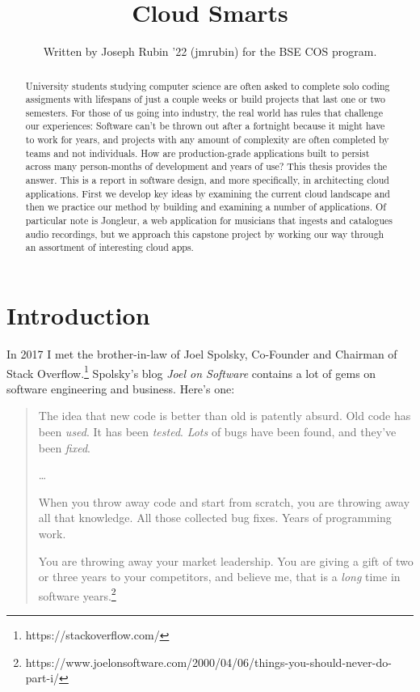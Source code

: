 \documentclass{article}
\begin{document}
\title{Cloud Smarts}

\author{Written by Joseph Rubin '22 (jmrubin) for the BSE COS program.}

\date{}
\maketitle

\thispagestyle{empty}


\begin{abstract}
  University students studying computer science are often asked to complete solo coding assigments with lifespans of just a couple weeks or build projects that last one or two semesters.
  For those of us going into industry, the real world has rules that challenge our experiences:
  Software can't be thrown out after a fortnight because it might have to work for years, and projects with any amount of complexity are often completed by teams and not individuals.
  How are production-grade applications built to persist across many person-months of development and years of use?
  This thesis provides the answer.
  This is a report in software design, and more specifically, in architecting cloud applications.
  First we develop key ideas by examining the current cloud landscape and then we practice our method by building and examining a number of applications.
  Of particular note is Jongleur, a web application for musicians that ingests and catalogues audio recordings, but we approach this capstone project by working our way through an assortment of interesting cloud apps.
\end{abstract}

\newpage

\section{Introduction}

In 2017 I met the brother-in-law of Joel Spolsky, Co-Founder and Chairman of Stack Overflow.\footnote{https://stackoverflow.com/}
Spolsky's blog \textit{Joel on Software} contains a lot of gems on software engineering and business.
Here's one:

\begin{quote}
  The idea that new code is better than old is patently absurd.
  Old code has been \textit{used}.
  It has been \textit{tested}.
  \textit{Lots} of bugs have been found, and they’ve been \textit{fixed}.

  \ldots

  When you throw away code and start from scratch, you are throwing away all that knowledge.
  All those collected bug fixes.
  Years of programming work.

  You are throwing away your market leadership.
  You are giving a gift of two or three years to your competitors, and believe me, that is a \textit{long} time in software years.\footnote{https://www.joelonsoftware.com/2000/04/06/things-you-should-never-do-part-i/}
\end{quote}
\end{document}

